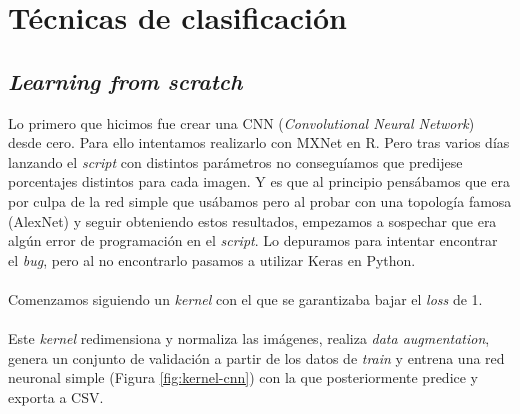 \section{Técnicas de clasificación}

\subsection{\textit{Learning from scratch}}

Lo primero que hicimos fue crear una CNN (\textit{Convolutional Neural Network}) desde cero. Para ello intentamos realizarlo con MXNet en R. Pero tras varios días lanzando el \textit{script} con distintos parámetros no conseguíamos que predijese porcentajes distintos para cada imagen. Y es que al principio pensábamos que era por culpa de la red simple que usábamos pero al probar con una topología famosa (AlexNet) y seguir obteniendo estos resultados, empezamos a sospechar que era algún error de programación en el \textit{script}. Lo depuramos para intentar encontrar el \textit{bug}, pero al no encontrarlo pasamos a utilizar Keras en Python.
\\ \\
Comenzamos siguiendo un \textit{kernel} \cite{StartKernel} con el que se garantizaba bajar el \textit{loss} de 1.
\\ \\
Este \textit{kernel} redimensiona y normaliza las imágenes, realiza \textit{data augmentation}, genera un conjunto de validación a partir de los datos de \textit{train} y entrena una red neuronal simple (Figura \ref{fig:kernel-cnn}) con la que posteriormente predice y exporta a CSV.

